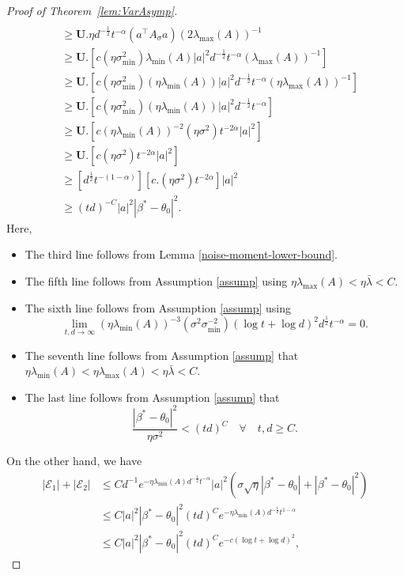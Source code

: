 \documentclass[11pt, reqno,english]{amsart}
\begin{document}
\begin{proof}[Proof of Theorem~\ref{lem:VarAsymp}]
\begin{align*}
\\
&\geq \mathbf{U}. \eta d^{-\frac{1}{2}}t^{-\alpha} (a^\top A_{\sigma} a) (2 \lambda_{\max}(A))^{-1}
\\
&\geq \mathbf{U}. [c(\eta\sigma^2_{\min})\lambda_{\min}(A) |a|^2d^{-\frac{1}{2}} t^{-\alpha} (\lambda_{\max}(A))^{-1}]
\\
&\geq \mathbf{U}. [c(\eta\sigma^2_{\min})(\eta\lambda_{\min}(A)) |a|^2d^{-\frac{1}{2}} t^{-\alpha} (\eta\lambda_{\max}(A))^{-1}]
\\
&\geq \mathbf{U}. [c(\eta\sigma^2_{\min})(\eta\lambda_{\min}(A)) |a|^2d^{-\frac{1}{2}} t^{-\alpha}]
\\
&\geq \mathbf{U}. [c (\eta \lambda_{\min}(A))^{-2} (\eta \sigma^2)t^{-2\alpha}|a|^2]
\\
&\geq \mathbf{U}.[c(\eta \sigma^2)t^{-2\alpha}|a|^2]
\\
&\geq [d^{\frac{1}{2}}t^{-(1 - \alpha)}][c.(\eta \sigma^2)t^{-2\alpha}]|a|^2
\\
&\geq (td)^{-C} |a|^2 |\beta^* - \theta_0|^2.
\end{align*}
Here,
\begin{itemize}
    \item The third line follows from Lemma \ref{noise-moment-lower-bound}.
    \item The fifth line follows from Assumption \ref{assump} using $\eta \lambda_{\max}(A) < \eta \bar{\lambda} < C$.
    \item The sixth line follows from Assumption \ref{assump} using 
    $$\lim\limits_{t,d \to \infty} (\eta \lambda_{\min}(A))^{-3} (\sigma^2\sigma^{-2}_{\min})(\log t + \log d)^2d^{\frac{1}{2}}t^{-\alpha} = 0.$$
    \item The seventh line follows from Assumption \ref{assump} that $\eta \lambda_{\min}(A) < \eta \lambda_{\max}(A) < \eta \bar{\lambda} < C$.
    \item The last line follows from Assumption \ref{assump} that
    $$\frac{|\beta^* - \theta_0|^2}{\eta \sigma^2} < (td)^{C} \quad \forall \quad  t, d \geq C.$$
\end{itemize} 
On the other hand, we have
\begin{align*}
|\mathcal E_1| + |\mathcal E_2| &\leq Cd^{-1}e^{-\eta \lambda_{\min}(A)d^{-\frac{1}{2}}t^{-\alpha}}|a|^2 (\sigma\sqrt{\eta} |\beta^* - \theta_0| + |\beta^* - \theta_0|^2)
\\
&\leq C|a|^2|\beta^* - \theta_0|^2 (td)^C e^{-\eta \lambda_{\min}(A)d^{-\frac{1}{2}}t^{1-\alpha}}
\\
&\leq C|a|^2|\beta^* - \theta_0|^2 (td)^C e^{-c(\log t + \log d)^2},

\end{align*}
\end{proof}
\end{document}
